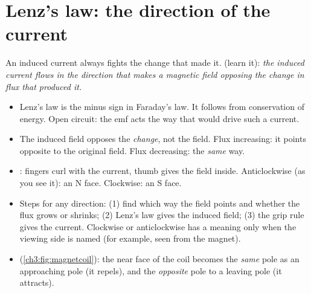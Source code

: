 \section{Lenz's law: the direction of the current}\label{ch3:sec:lenz}

\begin{bigidea}
An induced current always fights the change that made it. 
(learn it): \emph{the induced current flows in the direction that makes a magnetic
field opposing the change in flux that produced it.}
\end{bigidea}

\begin{itemize}
  \item Lenz's law is the minus sign in Faraday's law. It follows from conservation
        of energy. Open circuit: the emf acts the way that would drive such a current.
  \item The induced field opposes the \emph{change}, not the field. Flux increasing: it
        points opposite to the original field. Flux decreasing: the \emph{same} way.
  \item {}: fingers curl with the current, thumb gives the
        field inside. Anticlockwise (as you see it): an N face. Clockwise: an S face.
  \item Steps for any direction: (1) find which way the field points and whether the
        flux grows or shrinks; (2) Lenz's law gives the induced field; (3) the grip
        rule gives the current. Clockwise or anticlockwise has a meaning only when the
        viewing side is named (for example, seen from the magnet).
  \item {} (\cref{ch3:fig:magnetcoil}): the near face of the coil becomes
        the \emph{same} pole as an approaching pole (it repels), and the
        \emph{opposite} pole to a leaving pole (it attracts).
\end{itemize}

